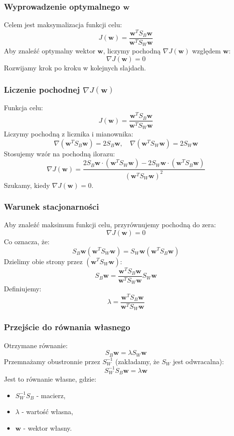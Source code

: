 \documentclass{beamer}
\begin{document}
\begin{frame}
    \frametitle{Wyprowadzenie optymalnego \(\mathbf{w}\)}
    Celem jest maksymalizacja funkcji celu:
    \[
    J(\mathbf{w}) = \frac{\mathbf{w}^T S_B \mathbf{w}}{\mathbf{w}^T S_W \mathbf{w}}
    \]
    Aby znaleźć optymalny wektor \(\mathbf{w}\), liczymy pochodną \(\nabla J(\mathbf{w})\) względem \(\mathbf{w}\):
    \[
    \nabla J(\mathbf{w}) = 0
    \]
    Rozwijamy krok po kroku w kolejnych slajdach.
\end{frame}

\begin{frame}
    \frametitle{Liczenie pochodnej \(\nabla J(\mathbf{w})\)}
    Funkcja celu:
    \[
    J(\mathbf{w}) = \frac{\mathbf{w}^T S_B \mathbf{w}}{\mathbf{w}^T S_W \mathbf{w}}
    \]
    Liczymy pochodną z licznika i mianownika:
    \[
    \nabla \left( \mathbf{w}^T S_B \mathbf{w} \right) = 2 S_B \mathbf{w}, \quad 
    \nabla \left( \mathbf{w}^T S_W \mathbf{w} \right) = 2 S_W \mathbf{w}
    \]
    Stosujemy wzór na pochodną ilorazu:
    \[
    \nabla J(\mathbf{w}) = \frac{2 S_B \mathbf{w} \cdot (\mathbf{w}^T S_W \mathbf{w}) - 2 S_W \mathbf{w} \cdot (\mathbf{w}^T S_B \mathbf{w})}{(\mathbf{w}^T S_W \mathbf{w})^2}
    \]
    Szukamy, kiedy \(\nabla J(\mathbf{w}) = 0\).
\end{frame}



\begin{frame}
    \frametitle{Warunek stacjonarności}
    Aby znaleźć maksimum funkcji celu, przyrównujemy pochodną do zera:
    \[
    \nabla J(\mathbf{w}) = 0
    \]
    Co oznacza, że:
    \[
    S_B \mathbf{w} (\mathbf{w}^T S_W \mathbf{w}) = S_W \mathbf{w} (\mathbf{w}^T S_B \mathbf{w})
    \]
    Dzielimy obie strony przez \((\mathbf{w}^T S_W \mathbf{w})\):
    \[
    S_B \mathbf{w} = \frac{\mathbf{w}^T S_B \mathbf{w}}{\mathbf{w}^T S_W \mathbf{w}} S_W \mathbf{w}
    \]
    Definiujemy:
    \[
    \lambda = \frac{\mathbf{w}^T S_B \mathbf{w}}{\mathbf{w}^T S_W \mathbf{w}}
    \]
\end{frame}






\begin{frame}
    \frametitle{Przejście do równania własnego}
    Otrzymane równanie:
    \[
    S_B \mathbf{w} = \lambda S_W \mathbf{w}
    \]
    Przemnażamy obustronnie przez \( S_W^{-1} \) (zakładamy, że \( S_W \) jest odwracalna):
    \[
    S_W^{-1} S_B \mathbf{w} = \lambda \mathbf{w}
    \]
    Jest to równanie własne, gdzie:
    \begin{itemize}
        \item \( S_W^{-1} S_B \) - macierz,
        \item \(\lambda\) - wartość własna,
        \item \(\mathbf{w}\) - wektor własny.
    \end{itemize}
\end{frame}
\end{document}
